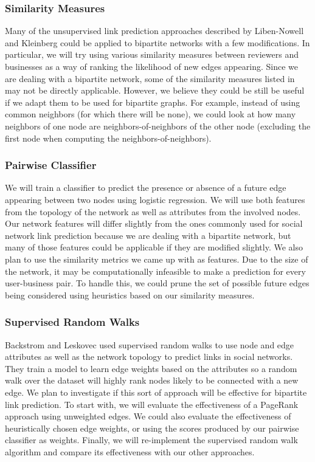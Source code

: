 \documentclass[11pt]{article}
\begin{document}
\subsubsection{Similarity Measures}
Many of the unsupervised link prediction approaches described by Liben-Nowell and Kleinberg \cite{nowellklein} could be applied to bipartite networks with a few modifications. In particular, we will try using various similarity measures between reviewers and businesses as a way of ranking the likelihood of new edges appearing. Since we are dealing with a bipartite network, some of the similarity measures listed in \cite{nowellklein} may not be directly applicable. However, we believe they could be still be useful if we adapt them to be used for bipartite graphs. For example, instead of using common neighbors (for which there will be none), we could look at how many neighbors of one node are neighbors-of-neighbors of the other node (excluding the first node when computing the neighbors-of-neighbors). 

\subsubsection{Pairwise Classifier}
We will train a classifier to predict the presence or absence of a future edge appearing between two nodes using logistic regression. We will use both features from the topology of the network as well as attributes from the involved nodes. Our network features will differ slightly from the ones commonly used for social network link prediction because we are dealing with a bipartite network, but many of those features could be applicable if they are modified slightly. We also plan to use the similarity metrics we came up with as features. Due to the size of the network, it may be computationally infeasible to make a prediction for every user-business pair. To handle this, we could prune the set of possible future edges being considered using heuristics based on our similarity measures.


\subsubsection{Supervised Random Walks}
Backstrom and Leskovec \cite{backstromjure} used supervised random walks to use node and edge attributes as well as the network topology to predict links in social networks. They train a model to learn edge weights based on the attributes so a random walk over the dataset will highly rank nodes likely to be connected with a new edge. We plan to investigate if this sort of approach will be effective for bipartite link prediction. To start with, we will evaluate the effectiveness of a PageRank approach using unweighted edges. We could also evaluate the effectiveness of heuristically chosen edge weights, or using the scores produced by our pairwise classifier as weights. Finally, we will re-implement the supervised random walk algorithm and compare its effectiveness with our other approaches. 
\end{document}
